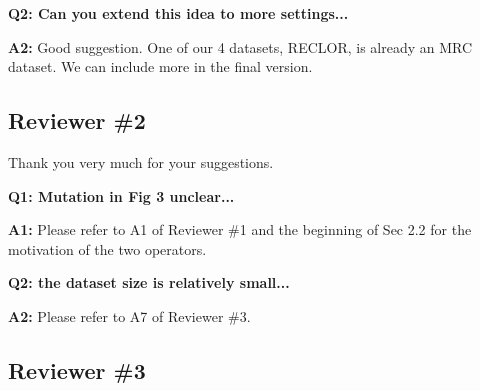 \documentclass[letterpaper]{article}
\begin{document}


\noindent
\textbf{Q2: Can you extend this idea to more settings...}

\noindent
\textbf{A2:} Good suggestion. One of our 4 datasets, RECLOR, is already 
an MRC dataset. We can include more in the final version. 

\subsection{Reviewer \#2} 

Thank you very much for your suggestions.

\textbf{Q1: Mutation in Fig 3 unclear...} 

\noindent
\textbf{A1:} Please refer to A1 of Reviewer \#1 and the beginning of Sec 2.2 for the motivation of 
the two operators.


\noindent
\textbf{Q2: the dataset size is relatively small...}

\noindent
\textbf{A2:} Please refer to A7 of Reviewer \#3.

\subsection{Reviewer \#3}
\end{document}
